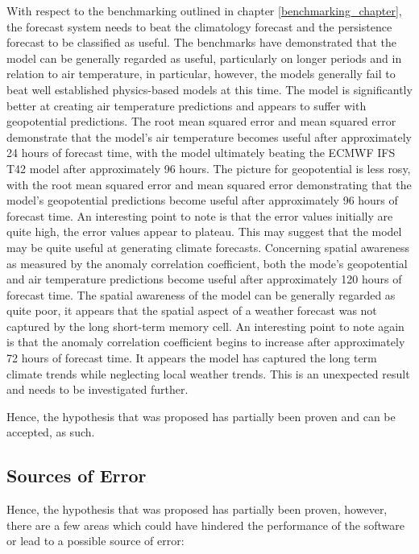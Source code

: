 With respect to the benchmarking outlined in chapter \ref{benchmarking_chapter}, the forecast system needs to beat the climatology forecast and the persistence forecast to be classified as useful. The benchmarks have demonstrated that the model can be generally regarded as useful, particularly on longer periods and in relation to air temperature, in particular, however, the models generally fail to beat well established physics-based models at this time. The model is significantly better at creating air temperature predictions and appears to suffer with geopotential predictions. The root mean squared error and mean squared error demonstrate that the model's air temperature becomes useful after approximately 24 hours of forecast time, with the model ultimately beating the ECMWF IFS T42 model after approximately 96 hours. The picture for geopotential is less rosy, with the root mean squared error and mean squared error demonstrating that the model's geopotential predictions become useful after approximately 96 hours of forecast time. An interesting point to note is that the error values initially are quite high, the error values appear to plateau. This may suggest that the model may be quite useful at generating climate forecasts. Concerning spatial awareness as measured by the anomaly correlation coefficient, both the mode's geopotential and air temperature predictions become useful after approximately 120 hours of forecast time. The spatial awareness of the model can be generally regarded as quite poor, it appears that the spatial aspect of a weather forecast was not captured by the long short-term memory cell. An interesting point to note again is that the anomaly correlation coefficient begins to increase after approximately 72 hours of forecast time. It appears the model has captured the long term climate trends while neglecting local weather trends. This is an unexpected result and needs to be investigated further. 

Hence, the hypothesis that was proposed has partially been proven and can be accepted, as such.

\subsection{Sources of Error}

Hence, the hypothesis that was proposed has partially been proven, however, there are a few areas which could have hindered the performance of the software or lead to a possible source of error:

